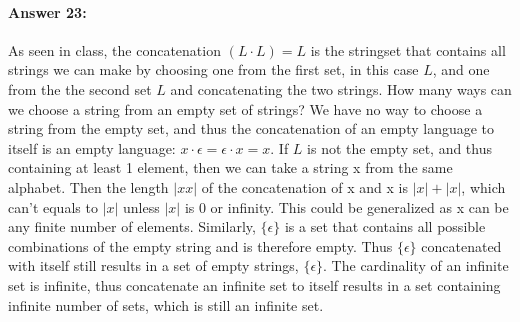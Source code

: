 \documentclass[10pt]{article}
\begin{document}
\paragraph{Answer 23:} As seen in class, the concatenation $(L\cdot L) = L$ is the stringset that contains all strings we can make 
by choosing one from the first set, in this case $L$, and one from the the second set $L$ and concatenating the two strings. How many ways can we choose a string from an empty set of strings? 
We have no way to choose a string from the empty set, and thus the concatenation of an empty language to itself is an empty language:
$x \cdot\epsilon = \epsilon\cdot x = x $. 
If $L$ is not the empty set, and thus containing at least 1 element, then we can take a string x from the same alphabet. Then the length $|xx|$ of the concatenation of x and x is $|x| + |x|$, 
which can't equals to $|x|$ unless $|x|$ is 0 or infinity. This could be generalized as x can be any finite number of elements.
Similarly, $\{ \epsilon \}$ is a set that contains all possible combinations of the empty string and is therefore empty. Thus $\{ \epsilon \}$  concatenated with itself still results in a set of empty strings, $\{ \epsilon \}$. 
The cardinality of an infinite set is infinite, thus concatenate an infinite set to itself results in a set containing infinite number of sets, which is still an infinite set. 
\end{document}

